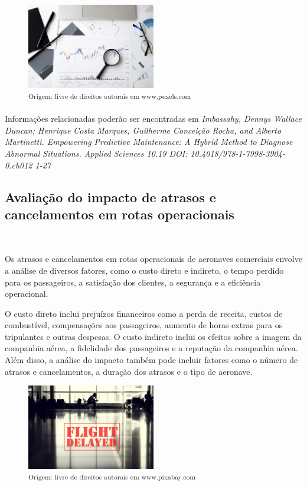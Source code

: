 \documentclass{amsart}
\begin{document}
\begin{figure}[h]
	\centering
	\includegraphics[width=0.5\textwidth]{Images/analise_dados.jpg}\\
	\small\textsuperscript{Origem: livre de direitos autorais em www.pexels.com}
\end{figure}

Informações relacionadas poderão ser encontradas em {\it Imbassahy, Dennys Wallace Duncan; Henrique Costa Marques, Guilherme Conceição Rocha, and Alberto Martinetti. Empowering Predictive Maintenance: A Hybrid Method to Diagnose Abnormal Situations. Applied Sciences 10.19 DOI: 10.4018/978-1-7998-3904-0.ch012 1-27}

\subsection{Avaliação do impacto de atrasos e cancelamentos em rotas operacionais}\

Os atrasos e cancelamentos em rotas operacionais de aeronaves comerciais envolve a análise de diversos fatores, como o custo direto e indireto, o tempo perdido para os passageiros, a satisfação dos clientes, a segurança e a eficiência operacional.

O custo direto inclui prejuízos financeiros como a perda de receita, custos de combustível, compensações aos passageiros, aumento de horas extras para os tripulantes e outras despesas. O custo indireto inclui os efeitos sobre a imagem da companhia aérea, a fidelidade dos passageiros e a reputação da companhia aérea. Além disso, a análise do impacto também pode incluir fatores como o número de atrasos e cancelamentos, a duração dos atrasos e o tipo de aeronave.

\begin{figure}[h]
	\centering
	\includegraphics[width=0.5\textwidth]{Images/flight_delay.jpg}\\
	\small\textsuperscript{Origem: livre de direitos autorais em www.pixabay.com}
\end{figure}
\end{document}

